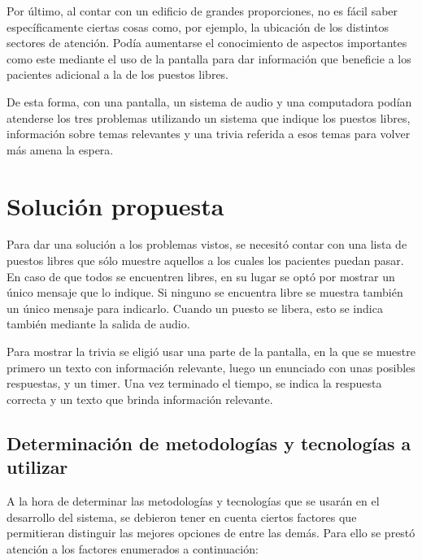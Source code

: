 \documentclass{article}
\begin{document}
Por último, al contar con un edificio de grandes proporciones, no es fácil saber específicamente ciertas cosas como, por ejemplo, la ubicación de los distintos sectores de atención. Podía aumentarse el conocimiento de aspectos importantes como este mediante el uso de la pantalla para dar información que beneficie a los pacientes adicional a la de los puestos libres.

De esta forma, con una pantalla, un sistema de audio y una computadora podían atenderse los tres problemas utilizando un sistema que indique los puestos libres, información sobre temas relevantes y una trivia referida a esos temas para volver más amena la espera.
\section{Solución propuesta}
Para dar una solución a los problemas vistos, se necesitó contar con una lista de puestos libres que sólo muestre aquellos a los cuales los pacientes puedan pasar. En caso de que todos se encuentren libres, en su lugar se optó por mostrar un único mensaje que lo indique. Si ninguno se encuentra libre se muestra también un único mensaje para indicarlo. Cuando un puesto se libera, esto se indica también mediante la salida de audio.

Para mostrar la trivia se eligió usar una parte de la pantalla, en la que se muestre primero un texto con información relevante, luego un enunciado con unas posibles respuestas, y un timer. Una vez terminado el tiempo, se indica la respuesta correcta y un texto que brinda información relevante.
\subsection{Determinación de metodologías y tecnologías a utilizar}
A la hora de determinar las metodologías y tecnologías que se usarán en el desarrollo del sistema, se debieron tener en cuenta ciertos factores que permitieran distinguir las mejores opciones de entre las demás. Para ello se prestó atención a los factores enumerados a continuación:
\end{document}

